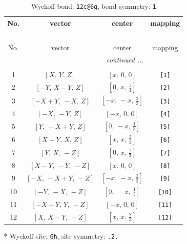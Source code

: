 \documentclass[fleqn,8pt]{jsarticle}
\begin{document}
\begin{longtable}{cccc}
\caption{Wyckoff bond: {\tt 12c@6g}, bond symmetry: {\tt 1}}
 \\
 \hline \hline
No. & vector & center & mapping \\ \hline \endfirsthead

\multicolumn{3}{l}{\tablename\ \thetable{}} \\
 \hline \hline
No. & vector & center & mapping \\ \hline \endhead

 \hline \hline
\multicolumn{3}{r}{\footnotesize\it continued ...} \\ \endfoot

 \hline \hline
\multicolumn{3}{r}{} \\ \endlastfoot

1 & $\left[ X,\, Y,\, Z \right]$ & $\left[ x,\, 0,\, 0 \right]$ & {\tt [1]} \\ \hline
2 & $\left[ - Y,\, X - Y,\, Z \right]$ & $\left[ 0,\, x,\, \frac{1}{3} \right]$ & {\tt [2]} \\ \hline
3 & $\left[ - X + Y,\, - X,\, Z \right]$ & $\left[ - x,\, - x,\, \frac{2}{3} \right]$ & {\tt [3]} \\ \hline
4 & $\left[ - X,\, - Y,\, Z \right]$ & $\left[ - x,\, 0,\, 0 \right]$ & {\tt [4]} \\ \hline
5 & $\left[ Y,\, - X + Y,\, Z \right]$ & $\left[ 0,\, - x,\, \frac{1}{3} \right]$ & {\tt [5]} \\ \hline
6 & $\left[ X - Y,\, X,\, Z \right]$ & $\left[ x,\, x,\, \frac{2}{3} \right]$ & {\tt [6]} \\ \hline
7 & $\left[ Y,\, X,\, - Z \right]$ & $\left[ 0,\, x,\, \frac{1}{3} \right]$ & {\tt [7]} \\ \hline
8 & $\left[ X - Y,\, - Y,\, - Z \right]$ & $\left[ x,\, 0,\, 0 \right]$ & {\tt [8]} \\ \hline
9 & $\left[ - X,\, - X + Y,\, - Z \right]$ & $\left[ - x,\, - x,\, \frac{2}{3} \right]$ & {\tt [9]} \\ \hline
10 & $\left[ - Y,\, - X,\, - Z \right]$ & $\left[ 0,\, - x,\, \frac{1}{3} \right]$ & {\tt [10]} \\ \hline
11 & $\left[ - X + Y,\, Y,\, - Z \right]$ & $\left[ - x,\, 0,\, 0 \right]$ & {\tt [11]} \\ \hline
12 & $\left[ X,\, X - Y,\, - Z \right]$ & $\left[ x,\, x,\, \frac{2}{3} \right]$ & {\tt [12]} \\
\end{longtable}
* Wyckoff site: {\tt 6h}, site symmetry: {\tt .2.}
\end{document}
